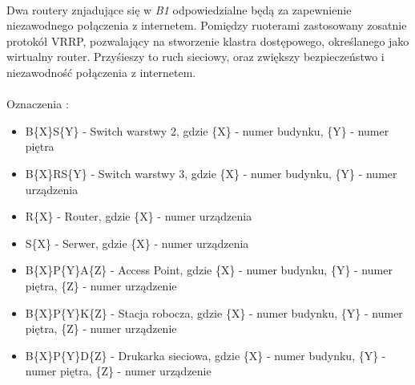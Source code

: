 \paragraph{}
Dwa routery znjadujące się w \textit{B1} odpowiedzialne będą za zapewnienie niezawodnego połączenia z internetem. Pomiędzy ruoterami zastosowany zosatnie protokół VRRP, pozwalający na stworzenie klastra dostępowego, określanego jako wirtualny router. Przyśieszy to ruch sieciowy, oraz zwiększy bezpieczeństwo i niezawodność połączenia z internetem.  

\newpage
\paragraph{}
Oznaczenia :
\begin{itemize}
	\item B\{X\}S\{Y\} - Switch warstwy 2, gdzie \{X\} - numer budynku, \{Y\} - numer piętra
	\item B\{X\}RS\{Y\} - Switch warstwy 3, gdzie \{X\} - numer budynku, \{Y\} - numer urządzenia
	\item R\{X\} - Router, gdzie \{X\} - numer urządzenia
	\item S\{X\} - Serwer, gdzie \{X\} - numer urządzenia
	\item B\{X\}P\{Y\}A\{Z\} - Access Point, gdzie \{X\} - numer budynku, \{Y\} - numer piętra, \{Z\} - numer urządzenie
	\item B\{X\}P\{Y\}K\{Z\} - Stacja robocza, gdzie \{X\} - numer budynku, \{Y\} - numer piętra, \{Z\} - numer urządzenie
	\item B\{X\}P\{Y\}D\{Z\} - Drukarka sieciowa, gdzie \{X\} - numer budynku, \{Y\} - numer piętra, \{Z\} - numer urządzenie
\end{itemize}

